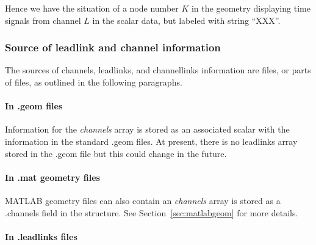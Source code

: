 \begin{description}
        Hence we have the situation of a node number $K$ in the geometry 
        displaying time signals from channel $L$ in the scalar data, but
        labeled with string ``XXX''. 

\end{description}

\subsubsection{Source of leadlink and channel information}

The sources of channels, leadlinks, and channellinks information are
files, or parts of files, as outlined in the following paragraphs.

\paragraph{In .geom files}

Information for the {\em channels\/} array is stored as an associated
scalar with the information in the standard .geom files.  At
present, there is no leadlinks array stored in the .geom file but
this could change in the future.

\paragraph{In .mat geometry files}

MATLAB geometry files can also contain an {\em channels\/} array is stored as
a .channels field in the structure.  See Section~\ref{sec:matlabgeom} for
more details.


\paragraph{In .leadlinks files}

